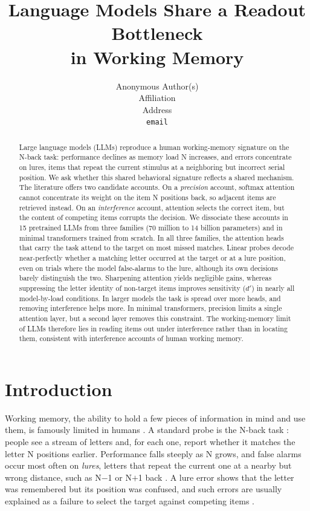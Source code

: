 \documentclass{article}
\title{Language Models Share a Readout Bottleneck\\in Working Memory}
\author{%
  Anonymous Author(s) \\
  Affiliation \\
  Address \\
  \texttt{email} \\
}
\newcommand{\dprime}{$d'$}
\begin{document}
\maketitle

\begin{abstract}
Large language models (LLMs) reproduce a human working-memory signature on the N-back task: performance declines as memory load N increases, and errors concentrate on lures, items that repeat the current stimulus at a neighboring but incorrect serial position. We ask whether this shared behavioral signature reflects a shared mechanism. The literature offers two candidate accounts. On a \emph{precision} account, softmax attention cannot concentrate its weight on the item N positions back, so adjacent items are retrieved instead. On an \emph{interference} account, attention selects the correct item, but the content of competing items corrupts the decision. We dissociate these accounts in 15 pretrained LLMs from three families (70 million to 14 billion parameters) and in minimal transformers trained from scratch. In all three families, the attention heads that carry the task attend to the target on most missed matches. Linear probes decode near-perfectly whether a matching letter occurred at the target or at a lure position, even on trials where the model false-alarms to the lure, although its own decisions barely distinguish the two. Sharpening attention yields negligible gains, whereas suppressing the letter identity of non-target items improves sensitivity (\dprime{}) in nearly all model-by-load conditions. In larger models the task is spread over more heads, and removing interference helps more. In minimal transformers, precision limits a single attention layer, but a second layer removes this constraint. The working-memory limit of LLMs therefore lies in reading items out under interference rather than in locating them, consistent with interference accounts of human working memory.
\end{abstract}

\section{Introduction}
\label{sec:intro}

Working memory, the ability to hold a few pieces of information in mind and use them, is famously limited in humans \citep{cowan2001magical,ma2014changing}. A standard probe is the N-back task \citep{kirchner1958age}: people see a stream of letters and, for each one, report whether it matches the letter N positions earlier. Performance falls steeply as N grows, and false alarms occur most often on \emph{lures}, letters that repeat the current one at a nearby but wrong distance, such as N$-$1 or N$+$1 back \citep{kane2007nback}. A lure error shows that the letter was remembered but its position was confused, and such errors are usually explained as a failure to select the target against competing items \citep{engle2002executive,oberauer2012interference,szmalec2011interference}.
\end{document}
